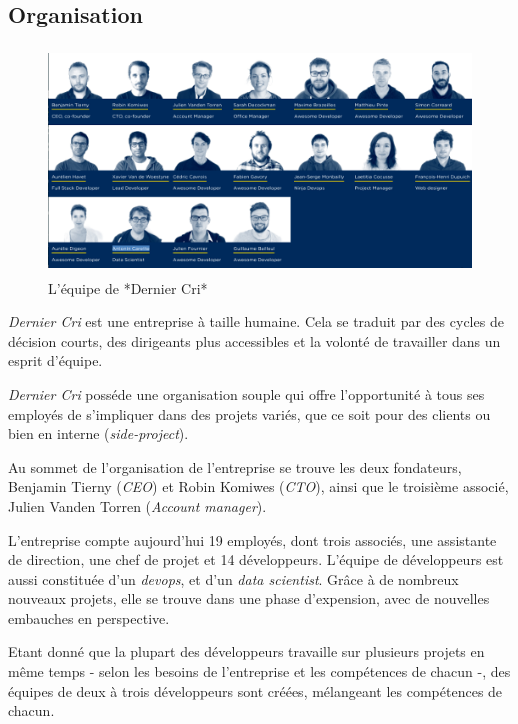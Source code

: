 \bigskip

\subsection{Organisation}\label{organisation}

\begin{figure}[h]
  \centering
  \includegraphics[height=6cm]{figures/team.png}
  \caption{L'équipe de *Dernier Cri*}
\end{figure}

\bigskip

\emph{Dernier Cri} est une entreprise à taille humaine. Cela se traduit
par des cycles de décision courts, des dirigeants plus accessibles et la
volonté de travailler dans un esprit d'équipe.

\bigskip

\emph{Dernier Cri} posséde une organisation souple qui offre
l'opportunité à tous ses employés de s'impliquer dans des projets
variés, que ce soit pour des clients ou bien en interne
(\emph{side-project}).

\bigskip

Au sommet de l'organisation de l'entreprise se trouve les deux
fondateurs, Benjamin Tierny (\emph{CEO}) et Robin Komiwes (\emph{CTO}),
ainsi que le troisième associé, Julien Vanden Torren (\emph{Account
manager}).

\bigskip

L'entreprise compte aujourd'hui 19 employés, dont trois associés, une
assistante de direction, une chef de projet et 14 développeurs. L'équipe
de développeurs est aussi constituée d'un \emph{devops}, et d'un
\emph{data scientist}. Grâce à de nombreux nouveaux projets, elle se
trouve dans une phase d'expension, avec de nouvelles embauches en
perspective.

\bigskip

Etant donné que la plupart des développeurs travaille sur plusieurs
projets en même temps - selon les besoins de l'entreprise et les
compétences de chacun -, des équipes de deux à trois développeurs sont
créées, mélangeant les compétences de chacun.

